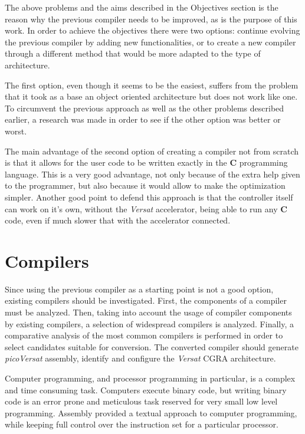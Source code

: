 The above problems and the aims described in the Objectives section is the
reason why the previous compiler needs to be improved, as is the purpose of this
work.  In order to achieve the objectives there were two options: continue
evolving the previous compiler by adding new functionalities, or to create a new
compiler through a different method that would be more adapted to the type of
architecture.

The first option, even though it seems to be the easiest, suffers from the
problem that it took as a base an object oriented architecture but does not work
like one. To circumvent the previous approach as well as the other problems
described earlier, a research was made in order to see if the other option was
better or worst.

The main advantage of the second option of creating a compiler not from scratch
is that it allows for the user code to be written exactly in the {\bf C}
programming language.
This is a very good advantage, not only because of the extra help given to the
programmer, but also because it would allow to make the optimization simpler.
Another good point to defend this approach is that the controller itself can
work on it's own, without the {\it Versat} accelerator, being able to run any
{\bf C} code, even if much slower that with the accelerator connected.

\section{Compilers} %
\label{section:compilers}


Since using the previous compiler as a starting point is not a good option,
existing compilers should be investigated.  First, the components of a compiler
must be analyzed.  Then, taking into account the usage of compiler components by
existing compilers, a selection of widespread compilers is analyzed.  Finally, a
comparative analysis of the most common compilers is performed in order to
select candidates suitable for conversion.  The converted compiler should
generate {\em picoVersat} assembly, identify and configure the {\em Versat} {\sc
  CGRA} architecture.

Computer programming, and processor programming in particular, is a complex and
time consuming task.  Computers execute binary code, but writing binary code is
an error prone and meticulous task reserved for very small low level
programming.  Assembly provided a textual approach to computer programming,
while keeping full control over the instruction set for a particular processor.

